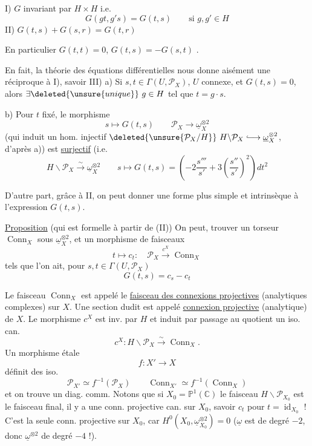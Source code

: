 I) $G$ invariant par $H\times H$ i.e.
\[
G(gt,g's)=G(t,s)\qquad\text{si }g,g'\in H
\]
II) $G(t,s)+G(s,r)=G(t,r)$

En particulier $G(t,t)=0$, $G(t,s)=-G(s,t)$ .

En fait, la théorie des équations différentielles nous donne aisément une réciproque à I), savoir
III) a) Si $s,t\in\Gamma(U,\mathcal P_X)$, $U$ connexe,  et $G(t,s)=0$, alors $\exists\deleted{\unsure{unique}}\ g\in H$ tel que $t=g\cdot s$.

b) Pour $t$ fixé, le morphisme
\[
s\longmapsto G(t,s)\qquad \mathcal P_X\longrightarrow\underline\omega_X^{\otimes2}
\]
(qui induit un hom. injectif $\deleted{\unsure{\mathcal P_X/H}}\ H\backslash\mathcal P_X\lhook\joinrel\longrightarrow\underline\omega_X^{\otimes2}$, d'après a)) est \uline{surjectif} (i.e.
\[
H\backslash\mathcal P_X\xrightarrow{\sim}\underline\omega_X^{\otimes2}\qquad s\longmapsto G(t,s)=\left(-2\frac{s'''}{s'}+3\left(\frac{s''}{s'}\right)^2\right)dt^2
\]

D'autre part, grâce à II, on peut donner une forme plus simple et intrinsèque à l'expression $G(t,s)$.

\uline{Proposition} (qui est formelle à partir de (II)) On peut,  trouver un torseur $\operatorname{Conn}_X$ sous $\underline\omega_X^{\otimes2}$, et un morphisme de faisceaux
\[
t\longmapsto c_t:\quad\mathcal P_X\xrightarrow{c^X}\operatorname{Conn}_X
\]
tels que l'on ait, pour $s,t\in\Gamma(U,\mathcal P_X)$
\[
\boxed{G(t,s)=c_s-c_t}
\]

\margin{!}
Le faisceau $\operatorname{Conn}_X$ est appelé le \uline{faisceau des connexions projectives} (analytiques complexes) sur $X$. Une section dudit est appelé \uline{connexion projective} (analytique) de $X$. Le morphisme $c^X$ est inv. par $H$ et induit par passage au quotient un iso. can.
\[
c^X:H\backslash\mathcal P_X\xrightarrow{\sim}\operatorname{Conn}_X.
\]
Un morphisme étale
\[
f:X'\longrightarrow X
\]
définit des iso.
\[
\mathcal P_{X'}\simeq f^{-1}(\mathcal P_X)\qquad \operatorname{Conn}_{X'}\simeq f^{-1}(\operatorname{Conn}_X)
\]
et on trouve un  diag. comm.
Notons que si $X_0=\mathbb P^1(\mathbb C)$  le faisceau $H\backslash\mathcal P_{X_0}$ est le faisceau final,   il y a une conn. projective can.  sur $X_0$, savoir $c_t$ pour $t=\operatorname{id}_{X_0}$ ! C'est la seule conn. projective sur $X_0$, car $H^0(X_0,\underline\omega_{X_0}^{\otimes2})=0$ ($\underline\omega$ est de degré $-2$, donc $\underline\omega^{\otimes2}$ de degré $-4$ !).

